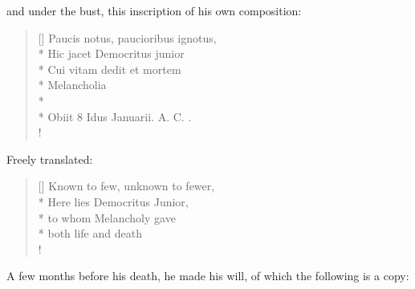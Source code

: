 and under the bust, this inscription of his own composition:

\settowidth{\versewidth}{Paucis notus, paucioribus ignotus,}
\begin{verse}[\versewidth]
Paucis notus, paucioribus ignotus,\\*
Hic jacet Democritus junior\\*
Cui vitam dedit et mortem\\*
Melancholia\\*
\hrulefill\\*
Obiit 8 Idus Januarii. A. C. {}.\\!
\end{verse}

Freely translated:

\settowidth{\versewidth}{Known to few, unknown to fewer,}
\begin{verse}[\versewidth]
Known to few, unknown to fewer,\\*
Here lies Democritus Junior,\\*
to whom Melancholy gave\\*
both life and death\\!
\end{verse}


A few months before his death, he made his will, of which the following is a copy:
\\

